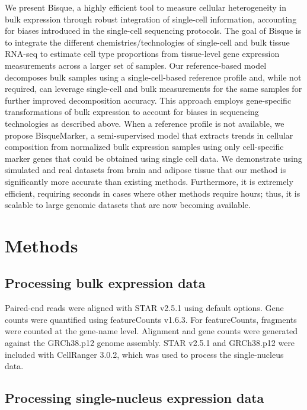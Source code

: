 We present Bisque, a highly efficient tool to measure cellular heterogeneity in bulk expression through robust integration of single-cell information, accounting for biases introduced in the single-cell sequencing protocols. The goal of Bisque is to integrate the different chemistries/technologies of single-cell and bulk tissue RNA-seq to estimate cell type proportions from tissue-level gene expression measurements across a larger set of samples. Our reference-based model decomposes bulk samples using a single-cell-based reference profile and, while not required, can leverage single-cell and bulk measurements for the same samples for further improved decomposition accuracy. This approach employs gene-specific transformations of bulk expression to account for biases  in sequencing technologies as described above. When a reference profile is not available, we propose BisqueMarker, a semi-supervised model that extracts trends in cellular composition from normalized bulk expression samples using only cell-specific marker genes that could be obtained using single cell data. We demonstrate using simulated and real datasets from brain and adipose tissue that our method is significantly more accurate than existing methods. Furthermore, it is extremely efficient, requiring seconds in cases where other methods require hours; thus, it is scalable to large genomic datasets that are now becoming available.

\section{Methods}

\subsection{Processing bulk expression data}

Paired-end reads were aligned with STAR v2.5.1 using default options.  Gene counts were quantified using featureCounts v1.6.3. For featureCounts, fragments were counted at the gene-name level. Alignment and gene counts were generated against the GRCh38.p12 genome assembly. STAR v2.5.1 and GRCh38.p12 were included with CellRanger 3.0.2, which was used to process the single-nucleus data.

\subsection{Processing single-nucleus expression data}

